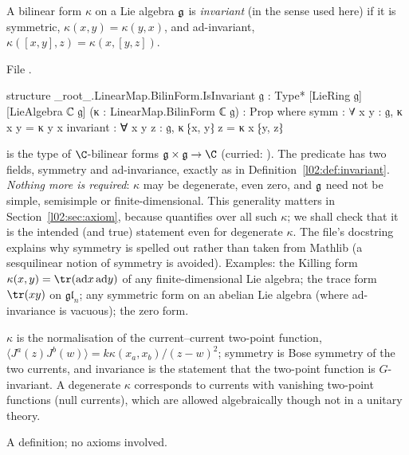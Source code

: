 \begin{definition}\label{l02:def:invariant}
A bilinear form $\kappa$ on a Lie algebra $\mathfrak{g}$ is \emph{invariant} (in the sense used here) if it
is symmetric, $\kappa(x,y) = \kappa(y,x)$, and ad-invariant, $\kappa([x,y],z) = \kappa(x,[y,z])$.
\end{definition}

File .
\begin{leancode}
structure _root_.LinearMap.BilinForm.IsInvariant {𝔤 : Type*} [LieRing 𝔤] [LieAlgebra ℂ 𝔤]
    (κ : LinearMap.BilinForm ℂ 𝔤) : Prop where
  symm : ∀ x y : 𝔤, κ x y = κ y x
  invariant : ∀ x y z : 𝔤, κ ⁅x, y⁆ z = κ x ⁅y, z⁆
\end{leancode}

\begin{dictionary}
 is the type of $\C$-bilinear forms $\ltwog\times\ltwog\to\C$
(curried: ). The predicate has two fields, symmetry and ad-invariance, exactly as in
Definition~\ref{l02:def:invariant}. \emph{Nothing more is required}: $\kappa$ may be degenerate,
even zero, and $\mathfrak{g}$ need not be simple, semisimple or finite-dimensional. This generality
matters in Section~\ref{l02:sec:axiom}, because  quantifies over all such $\kappa$; we
shall check that it is the intended (and true) statement even for degenerate $\kappa$. The file's docstring explains why
symmetry is spelled out rather than taken from Mathlib (a sesquilinear notion of symmetry is
avoided). Examples: the Killing form $\kappa(x,y) = \tr(\mathrm{ad}x\,\mathrm{ad}y)$ of any
finite-dimensional Lie algebra; the trace form $\tr(xy)$ on $\mathfrak{gl}_n$; any symmetric form on an abelian
Lie algebra (where ad-invariance is vacuous); the zero form.
\end{dictionary}

\begin{physics}
$\kappa$ is the normalisation of the current--current two-point function,
$\langle J^a(z)J^b(w)\rangle = k\kappa(x_a,x_b)/(z-w)^2$; symmetry is Bose symmetry of the two
currents, and invariance is the statement that the two-point function is $G$-invariant. A
degenerate $\kappa$ corresponds to currents with vanishing two-point functions (null currents),
which are allowed algebraically though not in a unitary theory.
\end{physics}

\begin{status}
A definition; no axioms involved.
\end{status}

